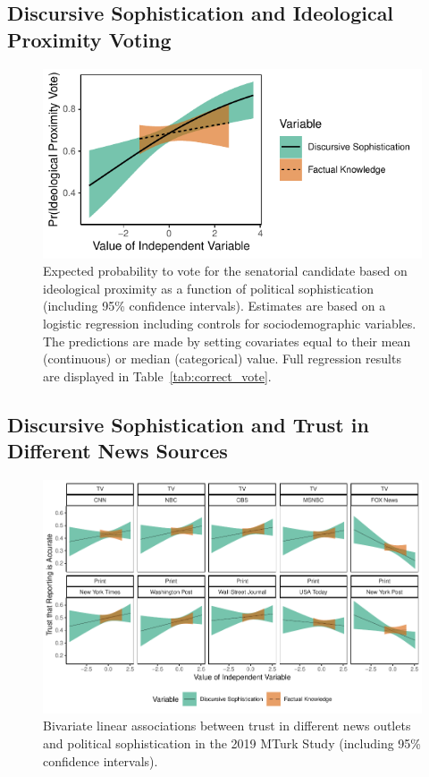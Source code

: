 \clearpage
\subsection{Discursive Sophistication and Ideological Proximity Voting}\label{app:proximity}

\begin{figure}[h]\centering
	\includegraphics{../fig/correct_vote.pdf}
	\caption{Expected probability to vote for the senatorial candidate based on ideological proximity as a function of political sophistication (including 95\% confidence intervals). Estimates are based on a logistic regression including controls for sociodemographic variables. The predictions are made by setting covariates equal to their mean (continuous) or median (categorical) value. Full regression results are displayed in Table~\ref{tab:correct_vote}.}\label{fig:correct_vote}
\end{figure}



\clearpage
\subsection{Discursive Sophistication and Trust in Different News Sources}\label{app:media}

\begin{figure}[h]\centering
	\includegraphics{../fig/media_trust.pdf}
	\caption{Bivariate linear associations between trust in different news outlets and political sophistication in the 2019 MTurk Study (including 95\% confidence intervals).}\label{fig:media_trust}
\end{figure}

